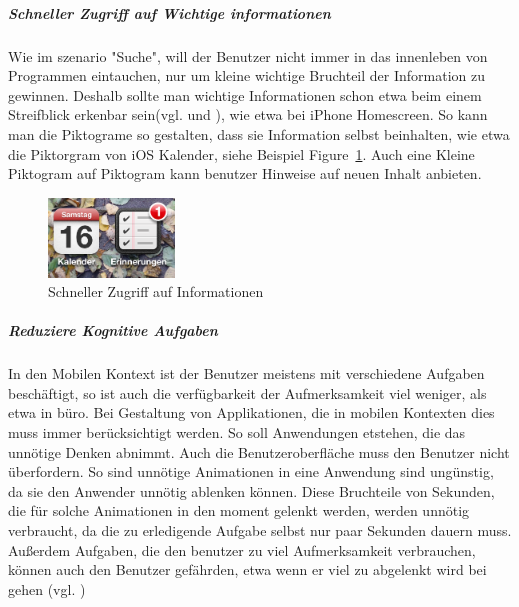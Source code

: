 \subparagraph{Schneller Zugriff auf Wichtige informationen} 
\label{subp:subparagraph_name}

Wie im szenario "Suche", will der Benutzer nicht immer in das innenleben von Programmen eintauchen, nur um kleine wichtige Bruchteil der Information zu gewinnen. Deshalb sollte man wichtige Informationen schon etwa beim einem Streifblick erkenbar sein(vgl. \cite[Seite 54]{mobileFrontier} und \cite{Neil:2012uf}),  wie etwa bei iPhone Homescreen. So kann man die Piktograme so gestalten, dass sie Information selbst beinhalten, wie etwa die Piktorgram von iOS Kalender, siehe Beispiel Figure~\ref{fig:iconIos}. Auch eine Kleine Piktogram auf Piktogram kann benutzer Hinweise auf neuen Inhalt anbieten.

\begin{figure}
	\begin{center}
	
	\includegraphics[width=0.3\textwidth]{img/iconIos.png}
	\caption{Schneller Zugriff auf Informationen}\label{fig:iconIos}
\end{center}
\end{figure}


\subparagraph{Reduziere Kognitive Aufgaben } 
\label{subp:reduziere_kognitive_aufgaben_}

In den Mobilen Kontext ist der Benutzer meistens mit verschiedene Aufgaben beschäftigt, so ist auch die verfügbarkeit der Aufmerksamkeit viel weniger, als etwa in büro. Bei Gestaltung von Applikationen, die in mobilen Kontexten dies muss immer berücksichtigt werden. So soll Anwendungen etstehen, die das unnötige Denken abnimmt. Auch die Benutzeroberfläche muss den Benutzer nicht überfordern. So sind unnötige Animationen in eine Anwendung sind ungünstig, da sie den Anwender unnötig ablenken können. Diese Bruchteile von Sekunden, die für solche Animationen in den moment gelenkt werden, werden unnötig verbraucht, da die zu erledigende Aufgabe selbst nur paar Sekunden dauern muss. Außerdem Aufgaben, die den benutzer zu viel Aufmerksamkeit verbrauchen, können auch den Benutzer gefährden, etwa wenn er viel zu abgelenkt wird bei gehen (vgl. \cite{Nasar:2008cc})




